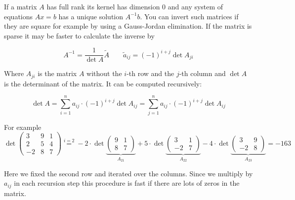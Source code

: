 If a matrix $A$ has full rank its kernel has dimension 0 and any system of equations $A x=b$ has a unique solution $A^{-1}b$. You can invert such matrices if they are square for example by using a Gauss-Jordan elimination. If the matrix is sparse it may be faster to calculate the inverse by

\[A^{-1} = \frac{1}{\det A} \tilde A \qquad \tilde a_{ij} = (-1)^{i+j} \det A_{ji}\]

Where $A_{ji}$ is the matrix $A$ without the $i$-th row and the $j$-th column and $\det A$ is the determinant of the matrix. It can be computed recursively:

\[\det A = \sum_{i=1}^n a_{ij} \cdot (-1)^{i+j} \det A_{ij} = \sum_{j=1}^n a_{ij} \cdot (-1)^{i+j} \det A_{ij} \]

For example
\[\det \begin{pmatrix} 
3 & 9 & 1\\
2 & 5 & 4\\
-2 & 8 & 7\end{pmatrix} \stackrel{i=2}{=}
-2\cdot \det \underbrace{\begin{pmatrix} 
9 & 1\\ 
8 & 7\end{pmatrix}}_{A_{21}} + 
5\cdot \det \underbrace{\begin{pmatrix}
3 & 1\\
-2 & 7\end{pmatrix}}_{A_{22}} -
4\cdot \det \underbrace{\begin{pmatrix} 
3 & 9\\ 
-2 & 8\end{pmatrix}}_{A_{23}}= -163\]

Here we fixed the second row and iterated over the columns. Since we multiply by $a_{ij}$ in each recursion step this procedure is fast if there are lots of zeros in the matrix.

